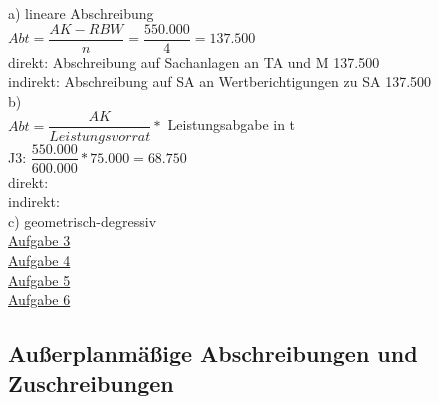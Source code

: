 \documentclass[paper=a4, fontsize=11pt]{scrartcl}
\numberwithin{equation}{section}
\numberwithin{figure}{section}
\numberwithin{table}{section}
\begin{document}
a) lineare Abschreibung \\
$Abt = \dfrac{AK-RBW}{n} = \dfrac{550.000}{4} = 137.500$ \\
direkt: Abschreibung auf Sachanlagen an TA und M 137.500 \\
indirekt: Abschreibung auf SA an Wertberichtigungen zu SA 137.500 \\
b) \\
$Abt= \dfrac{AK}{Leistungsvorrat} *$  Leistungsabgabe in t \\
J3: $\dfrac{550.000}{600.000} * 75.000 = 68.750$ \\
direkt: \\
indirekt: \\
c) geometrisch-degressiv \\
\underline{Aufgabe 3} \\
\underline{Aufgabe 4} \\
\underline{Aufgabe 5} \\
\underline{Aufgabe 6} \\

\subsection{Außerplanmäßige Abschreibungen und Zuschreibungen}
\end{document}
